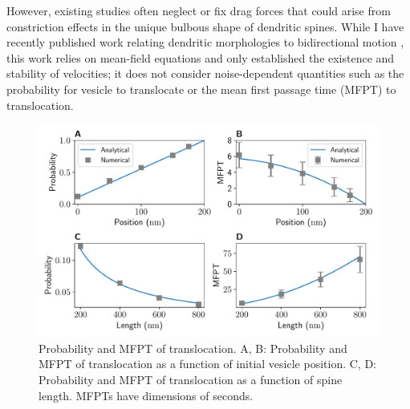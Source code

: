 \documentclass[a4paper,11pt]{article}
\begin{document}
	However, existing studies often neglect or fix drag forces that could arise from constriction effects in the unique bulbous shape of dendritic spines. While I have recently published work relating dendritic morphologies to bidirectional motion \cite{park2020dynamics}, this work relies on mean-field equations and only established the existence and stability of velocities; it does not consider noise-dependent quantities such as the probability for vesicle to translocate or the mean first passage time (MFPT) to translocation.
	
	\begin{figure}[ht!]
		\centering
		\includegraphics[width=\textwidth]{figures/f_mfpt_translocation.pdf}
		\caption{Probability and MFPT of translocation. A, B: Probability and MFPT of translocation as a function of initial vesicle position. C, D: Probability and MFPT of translocation as a function of spine length. MFPTs have dimensions of seconds.}\label{fig:mfpt}
	\end{figure}
	
\end{document}
